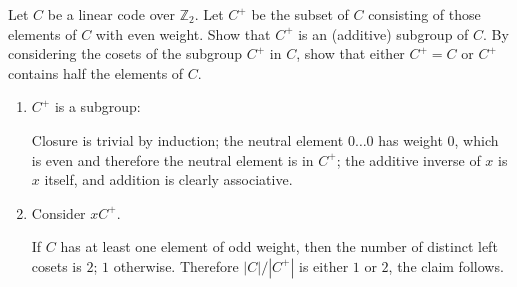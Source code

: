 \begin{exercise}
    Let \(C\) be a linear code over \(\mathbb{Z}_2\). Let \(C^+\) be the subset of \(C\) consisting of those elements of \(C\) with even weight. Show that \(C^+\) is an (additive) subgroup of \(C\). By considering the cosets of the subgroup \(C^+\) in \(C\), show that either \(C^+ = C\) or \(C^+\) contains half the elements of \(C\).
\end{exercise}
\begin{solution}\itemfix
    \begin{enumerate}
        \item \(C^+\) is a subgroup:

              Closure is trivial by induction; the neutral element \(0 \dots 0\) has weight \(0\), which is even and therefore the neutral element is in \(C^+\); the additive inverse of \(x\) is \(x\) itself, and addition is clearly associative.

        \item Consider \(xC^+\).
              \begin{caseof}
              \end{caseof}

              If \(C\) has at least one element of odd weight, then the number of distinct left cosets is \(2\); \(1\) otherwise. Therefore \(|C|/|C^+|\) is either \(1\) or \(2\), the claim follows.
    \end{enumerate}
\end{solution}

